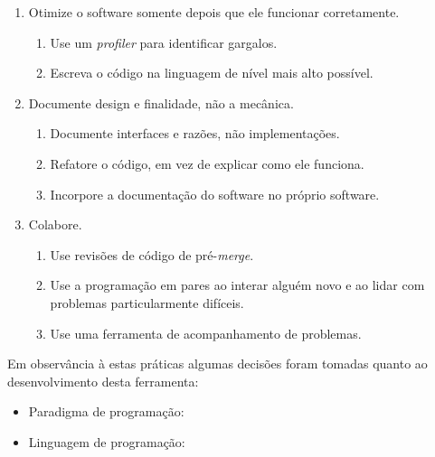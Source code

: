 \begin{tcolorbox}
\begin{enumerate}
\item Otimize o software somente depois que ele funcionar corretamente.
    \begin{enumerate}
        \item Use um \textit{profiler} para identificar gargalos.
        \item Escreva o código na linguagem de nível mais alto possível.
    \end{enumerate}

\item Documente design e finalidade, não a mecânica.
    \begin{enumerate}
        \item Documente interfaces e razões, não implementações.
        \item Refatore o código, em vez de explicar como ele funciona.
        \item Incorpore a documentação do software no próprio software.
    \end{enumerate}

\item Colabore.
    \begin{enumerate}
        \item Use revisões de código de pré-\textit{merge}.
        \item Use a programação em pares ao interar alguém novo e ao lidar com problemas particularmente difíceis.
        \item Use uma ferramenta de acompanhamento de problemas.
    \end{enumerate}
\end{enumerate}
\end{tcolorbox}

Em observância à estas práticas algumas decisões foram tomadas quanto ao desenvolvimento desta ferramenta:

\begin{itemize}
    \item Paradigma de programação: 
    \item Linguagem de programação:
\end{itemize}